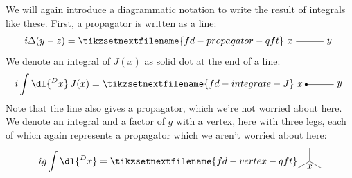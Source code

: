 \documentclass[fleqn]{NotesClass}
\begin{document}
    We will again introduce a diagrammatic notation to write the result of integrals like these.
    First, a propagator is written as a line:
    \begin{equation}
        i\Delta(y - z) = 
        \tikzsetnextfilename{fd-propagator-qft}
        \begin{tikzpicture}[baseline=(x.base)]
            \draw (0, 0) node[left] (x) {\(x\)} -- (1, 0) node[right] {\(y\)};
        \end{tikzpicture}
    \end{equation}
    We denote an integral of \(J(x)\) as solid dot at the end of a line:
    \begin{equation}
        i\int \dl{^Dx} \, J(x) = 
        \tikzsetnextfilename{fd-integrate-J}
        \begin{tikzpicture}[baseline=(x.base)]
            \draw (0, 0) node[left] (x) {\(x\)} -- (1, 0) node[right] {\(y\)};
            \fill (0, 0) circle [radius=0.05cm];
        \end{tikzpicture}
    \end{equation}
    Note that the line also gives a propagator, which we're not worried about here.
    We denote an integral and a factor of \(g\) with a vertex, here with three legs, each of which again represents a propagator which we aren't worried about here:
    \begin{equation}
        ig\int \dl{^D x} = 
        \tikzsetnextfilename{fd-vertex-qft}
        \begin{tikzpicture}[baseline={(0, -0.1)}]
            \draw (0, 0) -- (90:0.5);
            \draw (0, 0) -- (210:0.5);
            \draw (0, 0) -- (330:0.5);
            \node[below] at (0, 0) {\(x\)};
        \end{tikzpicture}
    \end{equation}
    
\end{document}
